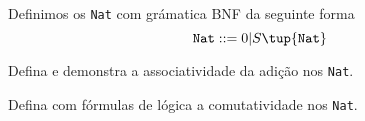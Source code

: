 \begin{definition}
  Definimos os \texttt{Nat} com gr\'amatica BNF da seguinte forma
  $$
  \mathtt{Nat} ::= 0 | S \tup{\mathtt{Nat}}
  $$
\end{definition}

\begin{exercise}
  Defina e demonstra a associatividade da adi\c c\~ao nos \texttt{Nat}.
\end{exercise}

\begin{homework}
  Defina com f\'ormulas de l\'ogica a comutatividade nos \texttt{Nat}.
\end{homework}
